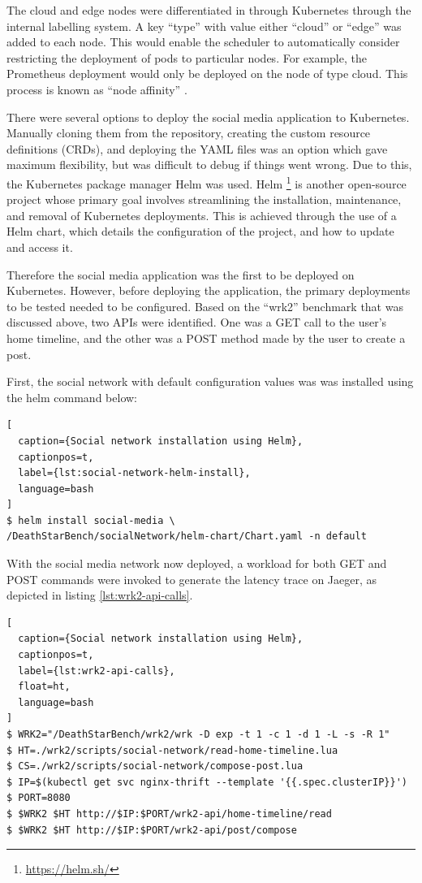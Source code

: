 The cloud and edge nodes were differentiated in through Kubernetes through the internal labelling system. A key ``type'' with value either ``cloud'' or ``edge'' was added to each node. This would enable the scheduler to automatically consider restricting the deployment of pods to particular nodes. For example, the Prometheus deployment would only be deployed on the node of type cloud. This process is known as ``node affinity'' \cite{santos2019towards}.\par

There were several options to deploy the social media application to Kubernetes. Manually cloning them from the repository, creating the custom resource definitions (CRDs), and deploying the YAML files was an option which gave maximum flexibility, but was difficult to debug if things went wrong. Due to this, the Kubernetes package manager Helm was used. Helm \footnote{\url{https://helm.sh/}} is another open-source project whose primary goal involves streamlining the installation, maintenance, and removal of Kubernetes deployments. This is achieved through the use of a Helm chart, which details the configuration of the project, and how to update and access it.\par

Therefore the social media application was the first to be deployed on Kubernetes. However, before deploying the application, the primary deployments to be tested needed to be configured. Based on the ``wrk2'' benchmark that was discussed above, two APIs were identified. One was a GET call to the user's home timeline, and the other was a POST method made by the user to create a post.\par

First, the social network with default configuration values was was installed using the helm command below:

\begin{lstlisting}[
  caption={Social network installation using Helm},
  captionpos=t,
  label={lst:social-network-helm-install},
  language=bash
]
$ helm install social-media \
/DeathStarBench/socialNetwork/helm-chart/Chart.yaml -n default
\end{lstlisting}

With the social media network now deployed, a workload for both GET and POST commands were invoked to generate the latency trace on Jaeger, as depicted in listing \ref{lst:wrk2-api-calls}.

\begin{lstlisting}[
  caption={Social network installation using Helm},
  captionpos=t,
  label={lst:wrk2-api-calls},
  float=ht,
  language=bash
]
$ WRK2="/DeathStarBench/wrk2/wrk -D exp -t 1 -c 1 -d 1 -L -s -R 1"
$ HT=./wrk2/scripts/social-network/read-home-timeline.lua
$ CS=./wrk2/scripts/social-network/compose-post.lua
$ IP=$(kubectl get svc nginx-thrift --template '{{.spec.clusterIP}}')
$ PORT=8080
$ $WRK2 $HT http://$IP:$PORT/wrk2-api/home-timeline/read
$ $WRK2 $HT http://$IP:$PORT/wrk2-api/post/compose
\end{lstlisting}

